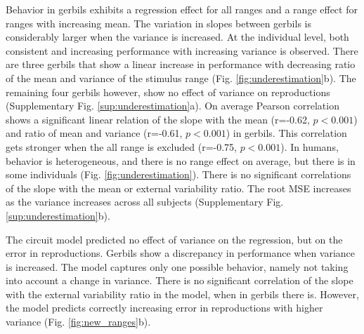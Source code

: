 \documentclass[10pt]{article}
\begin{document}
Behavior in gerbils exhibits a regression effect for all ranges and a range effect for ranges with increasing mean. 
The variation in slopes between gerbils is considerably larger when the variance is increased.
At the individual level, both consistent and increasing performance with increasing variance is observed. 
There are three gerbils that show a linear increase in performance with decreasing ratio of the mean and variance of the stimulus range (Fig. \ref{fig:underestimation}b). The remaining four gerbils however, show no effect of variance on reproductions (Supplementary Fig. \ref{sup:underestimation}a).
On average Pearson correlation shows a significant linear relation of the slope with the mean (r=-0.62, $p<0.001$) and ratio of mean and variance (r=-0.61, $p<0.001$) in gerbils.
This correlation gets stronger when the all range is excluded (r=-0.75, $p<0.001$).
In humans, behavior is heterogeneous, and there is no range effect on average, but there is in some individuals (Fig. \ref{fig:underestimation}). There is no significant correlations of the slope with the mean or external variability ratio.
The root MSE increases as the variance increases across all subjects (Supplementary Fig. \ref{sup:underestimation}b).

The circuit model predicted no effect of variance on the regression, but on the error in reproductions. 
Gerbils show a discrepancy in performance when variance is increased. 
The model captures only one possible behavior, namely not taking into account a change in variance. 
There is no significant correlation of the slope with the external variability ratio in the model, when in gerbils there is.
However, the model predicts correctly increasing error in reproductions with higher variance (Fig. \ref{fig:new_ranges}b).


\end{document}

